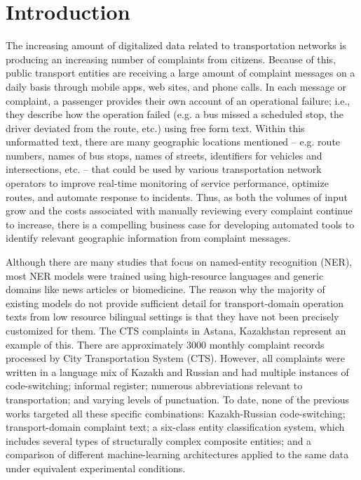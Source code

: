 %
%

\chapter*{Introduction}
{}

The increasing amount of digitalized data related to transportation networks is producing an increasing number of complaints from citizens. Because of this, public transport entities are receiving a large amount of complaint messages on a daily basis through mobile apps, web sites, and phone calls. In each message or complaint, a passenger provides their own account of an operational failure; i.e., they describe how the operation failed (e.g. a bus missed a scheduled stop, the driver deviated from the route, etc.) using free form text. Within this unformatted text, there are many geographic locations mentioned -- e.g. route numbers, names of bus stops, names of streets, identifiers for vehicles and intersections, etc. -- that could be used by various transportation network operators to improve real-time monitoring of service performance, optimize routes, and automate response to incidents. Thus, as both the volumes of input grow and the costs associated with manually reviewing every complaint continue to increase, there is a compelling business case for developing automated tools to identify relevant geographic information from complaint messages.

Although there are many studies that focus on named-entity recognition (NER), most NER models were trained using high-resource languages and generic domains like news articles or biomedicine. The reason why the majority of existing models do not provide sufficient detail for transport-domain operation texts from low resource bilingual settings is that they have not been precisely customized for them. The CTS complaints in Astana, Kazakhstan represent an example of this. There are approximately 3000 monthly complaint records processed by City Transportation System (CTS). However, all complaints were written in a language mix of Kazakh and Russian and had multiple instances of code-switching; informal register; numerous abbreviations relevant to transportation; and varying levels of punctuation. To date, none of the previous works targeted all these specific combinations: Kazakh-Russian code-switching; transport-domain complaint text; a six-class entity classification system, which includes several types of structurally complex composite entities; and a comparison of different machine-learning architectures applied to the same data under equivalent experimental conditions.

